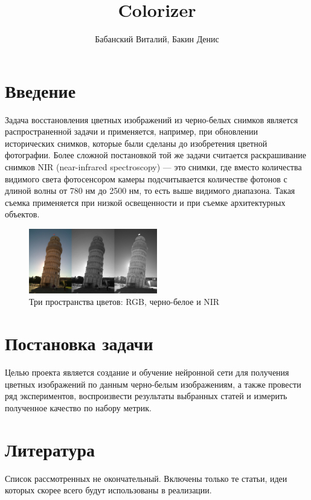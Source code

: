 \documentclass[14pt]{article}
\title{Colorizer}
\author{Бабанский Виталий, Бакин Денис}
\begin{document}
\maketitle
 
\section{Введение}

Задача восстановления цветных изображений из черно-белых снимков является распространенной задачи и применяется, например,
при обновлении исторических снимков, которые были сделаны до изобретения цветной фотографии.
Более сложной постановкой той же задачи считается раскрашивание снимков NIR (near-infrared spectroscopy) ---
это снимки, где вместо количества видимого света фотосенсором камеры подсчитывается количестве фотонов с длиной волны
от 780 нм до 2500 нм, то есть выше видимого диапазона. Такая съемка применяется при низкой освещенности и
при съемке архитектурных объектов.

\begin{figure}[H]
    \centering
    \includegraphics[width=0.5\textwidth]{resources/pisa_tower_3_colorspaces.jpg}
    \caption{Три пространства цветов: RGB, черно-белое и NIR}
    \label{fig:id_figura}
\end{figure}


\section{Постановка задачи}
Целью проекта является создание и обучение нейронной сети для получения цветных изображений по данным черно-белым изображениям,
а также провести ряд экспериментов, воспроизвести результаты выбранных статей и измерить полученное качество по набору метрик.


\section{Литература}
Список рассмотренных не окончательный. Включены только те статьи, идеи которых скорее всего будут использованы в реализации.
\end{document}
